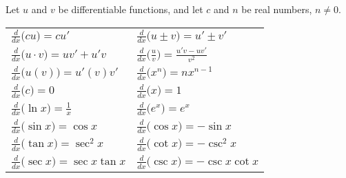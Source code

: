 \begin{theorem}\label{thm:deriv_glossary}
Let $u$ and $v$ be differentiable functions, and let $c$ and $n$ be real numbers, $n\neq 0$. \\
\begin{anywhereenum}
\renewcommand{\arraystretch}{1.6}
\begin{tabular}{ll}
	\item		$\frac{d}{dx}\bigl(cu\bigr) = cu'$ &
	\item		$\frac{d}{dx}\bigl(u\pm v\bigr) = u'\pm v'$ \\
	\item		$\frac{d}{dx}\bigl(u\cdot v\bigr) = uv'+u'v$ &
	\item		$\frac{d}{dx}\bigl(\frac uv\bigr) = \frac{u'v-uv'}{v^2}$ \\
	\item		$\frac{d}{dx}\bigl(u(v)\bigr) = u'(v)v'$ &
	\item		$\frac{d}{dx}\bigl(x^n\bigr) = nx^{n-1}$ \\
	\item		$\frac{d}{dx}\bigl(c\bigr) = 0$ &
	\item		$\frac{d}{dx}\bigl(x\bigr) = 1$ \\
	\item		$\frac{d}{dx}\bigl(\ln x\bigr) = \frac{1}{x}$ &
	\item		$\frac{d}{dx}\bigl(e^x\bigr) = e^x$ \\
	\item		$\frac{d}{dx}\bigl(\sin x\bigr) = \cos x$ &
	\item		$\frac{d}{dx}\bigl(\cos x\bigr) = -\sin x$ \\
	\item		$\frac{d}{dx}\bigl(\tan x\bigr) = \sec^2x$ &
	\item		$\frac{d}{dx}\bigl(\cot x\bigr) = -\csc^2x$ \\
	\item		$\frac{d}{dx}\bigl(\sec x\bigr) = \sec x\tan x$\qquad\null &
	\item		$\frac{d}{dx}\bigl(\csc x\bigr) = -\csc x\cot x$
\end{tabular}
\end{anywhereenum}
\end{theorem}

